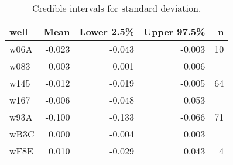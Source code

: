 \begin{table}[ht]
\centering
\begin{tabular}{lrrrr}
  \hline
well & Mean & Lower 2.5\% & Upper 97.5\% & n \\ 
  \hline
w06A & -0.023 & -0.043 & -0.003 &   10 \\ 
  w083 & 0.003 & 0.001 & 0.006 &  \\ 
  w145 & -0.012 & -0.019 & -0.005 &   64 \\ 
  w167 & -0.006 & -0.048 & 0.053 &  \\ 
  w93A & -0.100 & -0.133 & -0.066 &   71 \\ 
  wB3C & 0.000 & -0.004 & 0.003 &  \\ 
  wF8E & 0.010 & -0.029 & 0.043 &    4 \\ 
   \hline
\end{tabular}
\caption{Credible intervals for standard deviation.} 
\label{tab:sd}
\end{table}
